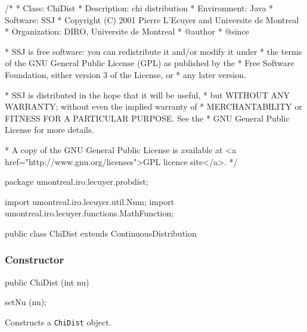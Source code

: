 \begin{code}
\begin{hide}
/*
 * Class:        ChiDist
 * Description:  chi distribution
 * Environment:  Java
 * Software:     SSJ 
 * Copyright (C) 2001  Pierre L'Ecuyer and Universite de Montreal
 * Organization: DIRO, Universite de Montreal
 * @author       
 * @since

 * SSJ is free software: you can redistribute it and/or modify it under
 * the terms of the GNU General Public License (GPL) as published by the
 * Free Software Foundation, either version 3 of the License, or
 * any later version.

 * SSJ is distributed in the hope that it will be useful,
 * but WITHOUT ANY WARRANTY; without even the implied warranty of
 * MERCHANTABILITY or FITNESS FOR A PARTICULAR PURPOSE.  See the
 * GNU General Public License for more details.

 * A copy of the GNU General Public License is available at
   <a href="http://www.gnu.org/licenses">GPL licence site</a>.
 */
\end{hide}
package umontreal.iro.lecuyer.probdist;\begin{hide}
import umontreal.iro.lecuyer.util.Num;
import umontreal.iro.lecuyer.functions.MathFunction;
\end{hide}

public class ChiDist extends ContinuousDistribution\begin{hide} {
   private int nu;
   private double C1;

   private static class Function implements MathFunction {
      protected int n;
      protected double sum;

      public Function (double s, int n)
      {
         this.n = n;
         this.sum = s;
      }

      public double evaluate (double k)
      {
         if (k < 1.0) return 1.0e200;
         return (sum + n * (Num.lnGamma (k / 2.0) - 0.5*(Num.LN2) - Num.lnGamma ((k + 1.0) / 2.0)));
      }
   }
\end{hide}
\end{code}
\subsubsection* {Constructor}

\begin{code}

   public ChiDist (int nu)\begin{hide} {
      setNu (nu);
   }\end{hide}
\end{code}
  \begin{tabb} Constructs a \texttt{ChiDist} object.
  \end{tabb}

